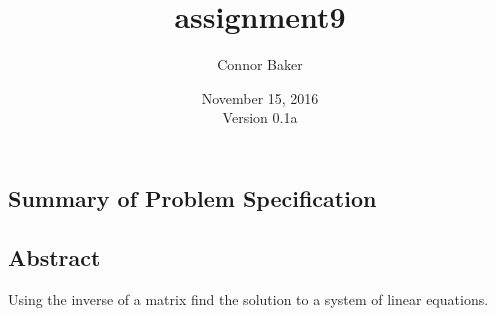 \documentclass[12pt]{article}
\begin{document}
\null
\nointerlineskip 
\vfill
\let \snewpage \newpage
\let \newpage \relax
    \title{assignment9}
    \author{Connor Baker}
    \date{November 15, 2016\\Version 0.1a}
\maketitle
\let \newpage \snewpage
\vfill
\thispagestyle{empty}



\newpage %



\makeatletter
{}
\renewcommand*\l@section{\@dottedtocline{1}{0em}{1.5em}}
\makeatother
\tableofcontents

\clearpage
{}

\begin{center}
\section{Summary of Problem Specification}
\end{center}
\subsection{Abstract}
Using the inverse of a matrix find the solution to a system of linear equations.
\end{document}
